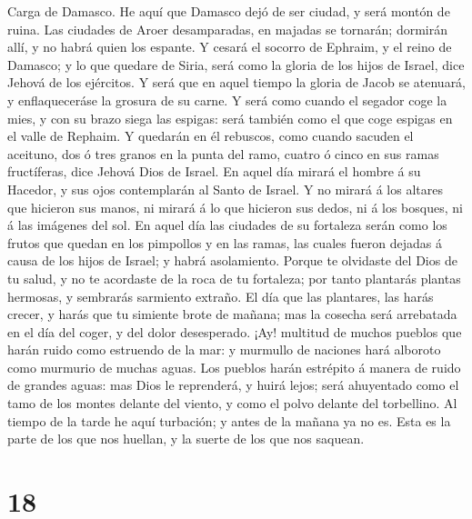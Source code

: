  Carga de Damasco. He aquí que Damasco dejó de ser ciudad,
y será montón de ruina.  Las ciudades de Aroer
desamparadas, en majadas se tornarán; dormirán allí, y no habrá quien
los espante.  Y cesará el socorro de Ephraim, y el reino
de Damasco; y lo que quedare de Siria, será como la gloria de los hijos
de Israel, dice Jehová de los ejércitos.  Y será que en
aquel tiempo la gloria de Jacob se atenuará, y enflaqueceráse la grosura
de su carne.  Y será como cuando el segador coge la mies,
y con su brazo siega las espigas: será también como el que coge espigas
en el valle de Rephaim.  Y quedarán en él rebuscos, como
cuando sacuden el aceituno, dos ó tres granos en la punta del ramo,
cuatro ó cinco en sus ramas fructíferas, dice Jehová Dios de Israel.
 En aquel día mirará el hombre á su Hacedor, y sus ojos
contemplarán al Santo de Israel.  Y no mirará á los
altares que hicieron sus manos, ni mirará á lo que hicieron sus dedos,
ni á los bosques, ni á las imágenes del sol.  En aquel día
las ciudades de su fortaleza serán como los frutos que quedan en los
pimpollos y en las ramas, las cuales fueron dejadas á causa de los hijos
de Israel; y habrá asolamiento.  Porque te olvidaste del
Dios de tu salud, y no te acordaste de la roca de tu fortaleza; por
tanto plantarás plantas hermosas, y sembrarás sarmiento extraño.
 El día que las plantares, las harás crecer, y harás que
tu simiente brote de mañana; mas la cosecha será arrebatada en el día
del coger, y del dolor desesperado.  ¡Ay! multitud de
muchos pueblos que harán ruido como estruendo de la mar: y murmullo de
naciones hará alboroto como murmurio de muchas aguas. 
Los pueblos harán estrépito á manera de ruido de grandes aguas: mas Dios
le reprenderá, y huirá lejos; será ahuyentado como el tamo de los montes
delante del viento, y como el polvo delante del torbellino.
 Al tiempo de la tarde he aquí turbación; y antes de la
mañana ya no es. Esta es la parte de los que nos huellan, y la suerte de
los que nos saquean.

\hypertarget{section-17}{%
\section{18}\label{section-17}}

